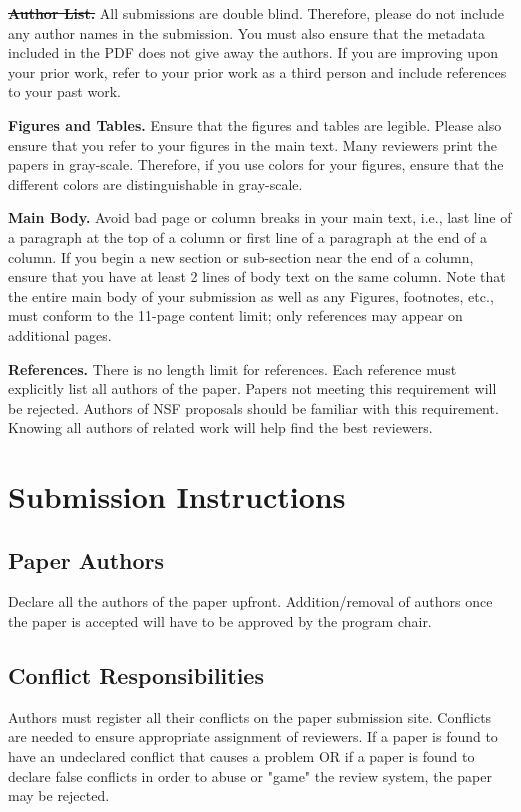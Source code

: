 \documentclass[pageno]{jpaper}
\begin{document}
\noindent\textbf{\sout{Author List.}} All submissions are double
blind. Therefore, please do not include any author names in the
submission. You must also ensure that the metadata included in the
PDF does not give away the authors. If you are improving upon your
prior work, refer to your prior work as a third person and include
references to your past work. 

\noindent\textbf{Figures and Tables.} Ensure that the figures and
tables are legible.  Please also ensure that you refer to your
figures in the main text. Many reviewers print the papers in
gray-scale. Therefore, if you use colors for your figures, ensure
that the different colors are distinguishable in gray-scale.

\noindent\textbf{Main Body.} Avoid bad page or column breaks in
your main text, i.e., last line of a paragraph at the top of a
column or first line of a paragraph at the end of a column. If you
begin a new section or sub-section near the end of a column,
ensure that you have at least 2 lines of body text on the same
column. Note that the entire main body of your submission as well as any
Figures, footnotes, etc., must conform to the 11-page content limit;
only references may appear on additional pages.

\noindent\textbf{References.} There is no length limit for references. 
Each reference must explicitly list all authors of the paper. 
Papers not meeting this requirement will be rejected. Authors of NSF 
proposals should be familiar with this requirement. Knowing all
authors of related work will help find the best reviewers.

\section{Submission Instructions}

\subsection{Paper Authors}

Declare all the authors of the paper upfront. Addition/removal of authors once
the paper is accepted will have to be approved by the program chair.

\subsection{Conflict Responsibilities}

Authors must register all their conflicts on the paper submission site. 
Conflicts are needed to ensure appropriate assignment of reviewers. If a paper
is found to have an undeclared conflict that causes a problem OR if a paper 
is found to declare false conflicts in order to abuse or "game" the review 
system, the paper may be rejected. 
 
\end{document}
